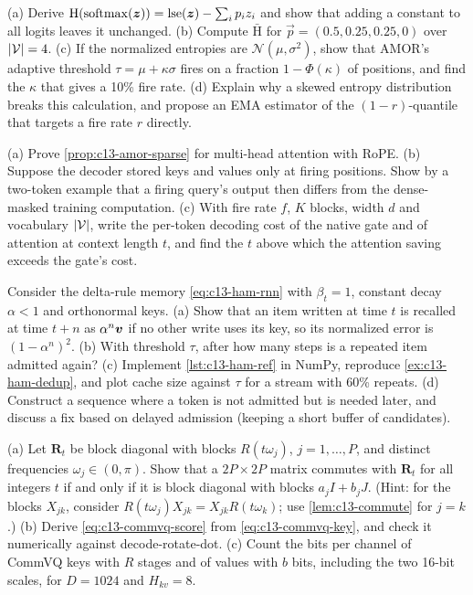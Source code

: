 \begin{exercise}\label{exr:c13-entropy}
(a) Derive $\mathrm{H}(\operatorname{softmax}(\bm{z}))=\operatorname{lse}(\bm{z})-\sum_ip_iz_i$ and show that adding a constant to
all logits leaves it unchanged. (b) Compute $\bar{\mathrm{H}}$ for $\vec{p}=(0.5,0.25,0.25,0)$ over
$\left\lvert \mathcal{V}\right\rvert=4$. (c) If the normalized entropies are $\mathcal{N}(\mu,\sigma^2)$, show that AMOR's
adaptive threshold $\tau=\mu+\kappa\sigma$ fires on a fraction $1-\Phi(\kappa)$ of positions, and find the
$\kappa$ that gives a 10\% fire rate. (d) Explain why a skewed entropy distribution breaks this
calculation, and propose an EMA estimator of the $(1-r)$-quantile that targets a fire rate $r$ directly.
\end{exercise}

\begin{exercise}\label{exr:c13-amor}
(a) Prove \cref{prop:c13-amor-sparse} for multi-head attention with RoPE. (b) Suppose the decoder stored
keys and values only at firing positions. Show by a two-token example that a firing query's output then
differs from the dense-masked training computation. (c) With fire rate $f$, $K$ blocks, width $d$ and
vocabulary $\left\lvert \mathcal{V}\right\rvert$, write the per-token decoding cost of the native gate and of attention at
context length $t$, and find the $t$ above which the attention saving exceeds the gate's cost.
\end{exercise}

\begin{exercise}\label{exr:c13-ham}
Consider the delta-rule memory \eqref{eq:c13-ham-rnn} with $\beta_t=1$, constant decay $\alpha<1$ and
orthonormal keys. (a) Show that an item written at time $t$ is recalled at time $t+n$ as $\alpha^n\bm{v}$ if
no other write uses its key, so its normalized error is $(1-\alpha^n)^2$. (b) With threshold $\tau$, after how
many steps is a repeated item admitted again? (c) Implement \cref{lst:c13-ham-ref} in NumPy, reproduce
\cref{ex:c13-ham-dedup}, and plot cache size against $\tau$ for a stream with 60\% repeats.
(d) Construct a sequence where a token is not admitted but is needed later, and discuss a fix based on
delayed admission (keeping a short buffer of candidates).
\end{exercise}

\begin{exercise}\label{exr:c13-commute}
(a) Let $\bm{R}_t$ be block diagonal with blocks $R(t\omega_j)$, $j=1,\dots,P$, and distinct
frequencies $\omega_j\in(0,\pi)$. Show that a $2P\times2P$ matrix commutes with $\bm{R}_t$ for all integers $t$ if and
only if it is block diagonal with blocks $a_jI+b_jJ$. (Hint: for the blocks $X_{jk}$, consider
$R(t\omega_j)X_{jk}=X_{jk}R(t\omega_k)$; use \cref{lem:c13-commute} for $j=k$.) (b) Derive
\eqref{eq:c13-commvq-score} from \eqref{eq:c13-commvq-key}, and check it numerically against
decode-rotate-dot. (c) Count the bits per channel of CommVQ keys with $R$ stages and of values with
$b$ bits, including the two 16-bit scales, for $D=1024$ and $H_{kv}=8$.
\end{exercise}

